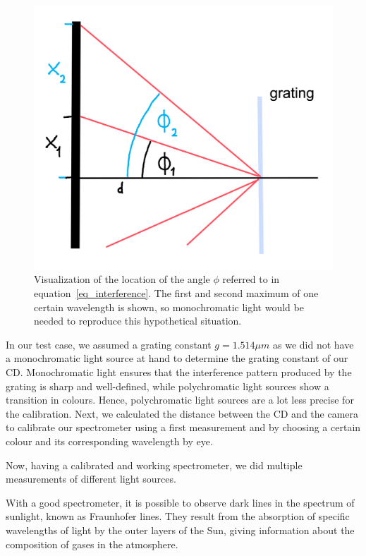     \begin{figure}[H]
        \centering
        \includegraphics[scale = 0.6]{src/images/angle_phi.png}
        \caption{Visualization of the location of the angle $\phi$ referred to in equation~\eqref{eq_interference}.
        The first and second maximum of one certain wavelength is shown, so monochromatic light would be needed to reproduce this hypothetical situation.}
        \label{fig_phi}
    \end{figure}

    In our test case, we assumed a grating constant $g = 1.514 \mu m$ \cite{src_grating_constant} as we did not have a monochromatic light source at hand to determine the grating constant of our CD.
    Monochromatic light ensures that the interference pattern produced by the grating is sharp and well-defined, while polychromatic light sources show a transition in colours.
    Hence, polychromatic light sources are a lot less precise for the calibration.
    Next, we calculated the distance between the CD and the camera to calibrate our spectrometer using a first measurement and by choosing a certain colour and its corresponding wavelength by eye.

    Now, having a calibrated and working spectrometer, we did multiple measurements of different light sources.

    With a good spectrometer, it is possible to observe dark lines in the spectrum of sunlight, known as Fraunhofer lines.
    They result from the absorption of specific wavelengths of light by the outer layers of the Sun, giving information about the composition of gases in the atmosphere.

